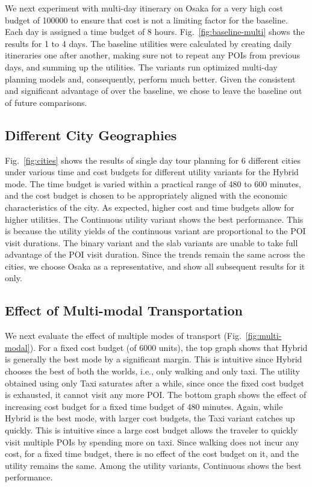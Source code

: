 We next experiment with multi-day itinerary on Osaka for a very high cost budget of 100000 to ensure that cost is not a limiting factor for the baseline.
Each day is assigned a time budget of 8 hours.
Fig.~\ref{fig:baseline-multi} shows the results for 1 to 4 days.
The baseline utilities were calculated by creating daily itineraries one after another, making sure not to repeat any POIs from previous days, and summing up the utilities.
The \trip variants run optimized multi-day planning models and, consequently, perform much better. Given the consistent and significant advantage of \trip over the baseline, we chose to leave the baseline out of future comparisons.

\subsection{Different City Geographies}
\label{sec:exp city geographies}

Fig.~\ref{fig:cities} shows the results of single day tour planning for 6 different cities under various time and cost budgets for different utility variants for the Hybrid mode.
The time budget is varied within a practical range of 480 to 600 minutes, and the cost budget is chosen to be appropriately aligned with the economic characteristics of the city.
As expected, higher cost and time budgets allow for higher utilities.
The Continuous utility variant shows the best performance. This is because the utility yields of the continuous variant are proportional to the POI visit durations. The binary variant and the slab variants are unable to take full advantage of the POI visit duration.
Since the trends remain the same across the cities, we choose Osaka as a representative, and show all subsequent results for it only.

\subsection{Effect of Multi-modal Transportation}
\label{sec:exp multimodal}

We next evaluate the effect of multiple modes of transport (Fig.~\ref{fig:multi-modal}).
For a fixed cost budget (of 6000 units), the top graph shows that Hybrid is generally the best mode by a significant margin. This is intuitive since Hybrid chooses the best of both the worlds, i.e., only walking and only taxi.
The utility obtained using only Taxi saturates after a while, since once the fixed cost budget is exhausted, it cannot visit any more POI.
The bottom graph shows the effect of increasing cost budget for a fixed time budget of 480 minutes.
Again, while Hybrid is the best mode, with larger cost budgets, the Taxi variant catches up quickly.
This is intuitive since a large cost budget allows the traveler to quickly visit multiple POIs by spending more on taxi.
Since walking does not incur any cost, for a fixed time budget, there is no effect of the cost budget on it, and the utility remains the same.
Among the utility variants, Continuous shows the best performance.

